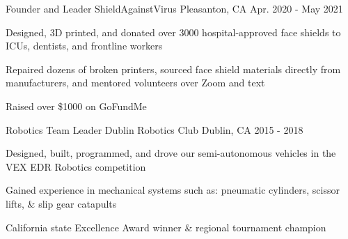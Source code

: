 \begin{cventries}
\cventry
{Founder and Leader} %
{ShieldAgainstVirus} %
{Pleasanton, CA} %
{Apr. 2020 - May 2021} %
{ %
\begin{cvitems}
\item {Designed, 3D printed, and donated over 3000 hospital-approved face shields to ICUs, dentists, and frontline workers}
\item {Repaired dozens of broken printers, sourced face shield materials directly from\\ manufacturers, and mentored volunteers over Zoom and text}
\item {Raised over \$1000 on GoFundMe}
\end{cvitems}
}




\cventry
{Robotics Team Leader} %
{Dublin Robotics Club} %
{Dublin, CA} %
{2015 - 2018} %
{ %
\begin{cvitems}
\item {Designed, built, programmed, and drove our semi-autonomous vehicles in the VEX EDR Robotics competition}
\item {Gained experience in mechanical systems such as: pneumatic cylinders, scissor lifts, \& slip gear catapults}
\item {California state Excellence Award winner \& regional tournament champion}
\end{cvitems}
}










\end{cventries}
